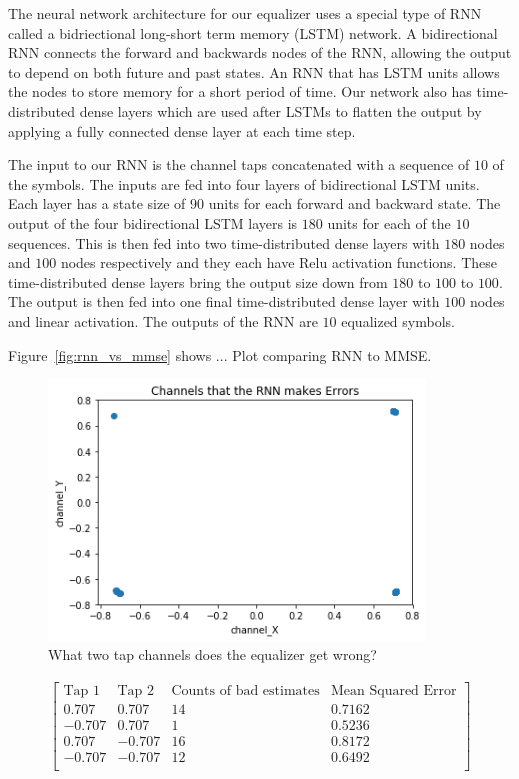 The neural network architecture for our equalizer uses a special type of RNN called a bidriectional long-short term memory (LSTM) network.  
A bidirectional RNN connects the forward and backwards nodes of the RNN, allowing the output to depend on both future and past states.
An RNN that has LSTM units allows the nodes to store memory for a short period of time.
Our network also has time-distributed dense layers which are used after LSTMs to flatten the output by applying a fully connected dense layer at each time step.

The input to our RNN is the channel taps concatenated with a sequence of $10$ of the symbols.  The inputs are fed into four layers of bidirectional LSTM units.  Each layer has a state size of $90$ units for each forward and backward state.  The output of the four bidirectional LSTM layers is $180$ units for each of the $10$ sequences.  
This is then fed into two time-distributed dense layers with $180$ nodes and $100$ nodes respectively and they each have Relu activation functions. These time-distributed dense layers bring the output size down from $180$ to $100$ to $100$.  The output is then fed into one final time-distributed dense layer with $100$ nodes and linear activation.  The outputs of the RNN are $10$ equalized symbols.  


Figure~\ref{fig:rnn_vs_mmse} shows ... 
Plot comparing RNN to MMSE.


\begin{figure}
\begin{center}
\includegraphics[width=100mm]{figures/equal/incorrect_channels.png}
\caption{What two tap channels does the equalizer get wrong?}
\label{fig:incorr_chan}
\end{center}
\end{figure}

\begin{align*}
\begin{bmatrix}
\text{Tap 1} & \text{Tap 2} & \text{Counts of bad estimates} & \text{Mean Squared Error}\\
\hline
0.707 & 0.707 & 14 & 0.7162\\
-0.707 & 0.707 & 1 & 0.5236\\
0.707 & -0.707 & 16 & 0.8172\\
-0.707 & -0.707 & 12 & 0.6492\\
\end{bmatrix}
\end{align*}

